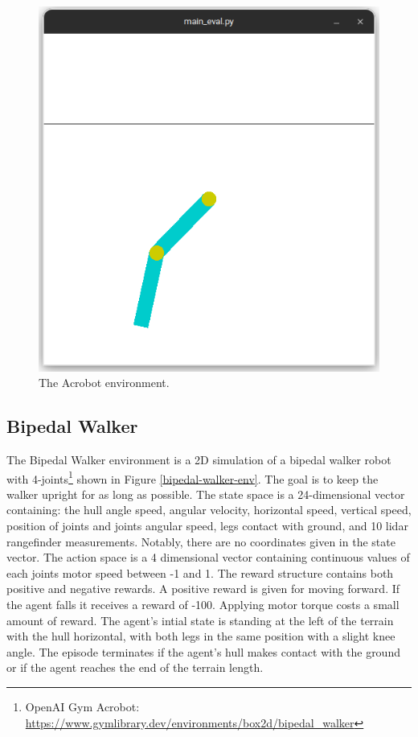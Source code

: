 \begin{figure}[htbp]
    \centerline{\includegraphics[width=\columnwidth]{./img/acrobot-env.png}}
    \caption{The Acrobot environment.}
    \label{fig:acrobot-env}
\end{figure}

\subsection{Bipedal Walker}
The Bipedal Walker environment is a 2D simulation of a bipedal walker robot with 
4-joints\footnote{OpenAI Gym Acrobot: \url{https://www.gymlibrary.dev/environments/box2d/bipedal_walker}} 
shown in Figure \ref{bipedal-walker-env}. The goal is to keep the walker upright for as long as possible.
The state space is a 24-dimensional vector containing: 
the hull angle speed, angular velocity, horizontal speed, vertical speed, position of joints and joints angular speed, 
legs contact with ground, and 10 lidar rangefinder measurements. Notably, there are no coordinates given in the state vector.
The action space is a 4 dimensional vector containing continuous values of each joints motor speed between -1 and 1.
The reward structure contains both positive and negative rewards. A positive reward is given for moving forward. If the agent falls it receives a reward of -100.
Applying motor torque costs a small amount of reward.
The agent's intial state is standing at the left of the terrain with the hull horizontal, with both legs in the same position with a slight knee angle. 
The episode terminates if the agent's hull makes contact with the ground or if the agent reaches the end of the terrain length.

